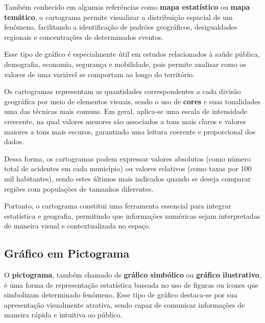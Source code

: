 Também conhecido em algumas referências como \textbf{mapa estatístico} ou
\textbf{mapa temático}, o cartograma permite visualizar a distribuição espacial
de um fenômeno, facilitando a identificação de padrões geográficos, desigualdades
regionais e concentrações de determinados eventos. \vskip0.3cm

Esse tipo de gráfico é especialmente útil em estudos relacionados à saúde pública,
demografia, economia, segurança e mobilidade, pois permite analisar como os valores
de uma variável se comportam ao longo do território. \vskip0.3cm

Os cartogramas representam as quantidades correspondentes a cada divisão geográfica
por meio de elementos visuais, sendo o uso de \textbf{cores} e suas tonalidades uma
das técnicas mais comuns. Em geral, aplica-se uma escala de intensidade crescente,
na qual valores menores são associados a tons mais claros e valores maiores a tons
mais escuros, garantindo uma leitura coerente e proporcional dos dados. \vskip0.3cm

Dessa forma, os cartogramas podem expressar valores absolutos (como número total de
acidentes em cada município) ou valores relativos (como taxas por 100 mil habitantes),
sendo estes últimos mais indicados quando se deseja comparar regiões com populações
de tamanhos diferentes. \vskip0.3cm

Portanto, o cartograma constitui uma ferramenta essencial para integrar estatística
e geografia, permitindo que informações numéricas sejam interpretadas de maneira
visual e contextualizada no espaço.








\newpage
\subsection{Gráfico em Pictograma}

O \textbf{pictograma}, também chamado de \textbf{gráfico simbólico} ou
\textbf{gráfico ilustrativo}, é uma forma de representação estatística
baseada no uso de figuras ou ícones que simbolizam determinado fenômeno.
Esse tipo de gráfico destaca-se por sua apresentação visualmente atrativa,
sendo capaz de comunicar informações de maneira rápida e intuitiva ao público. \vskip0.3cm

